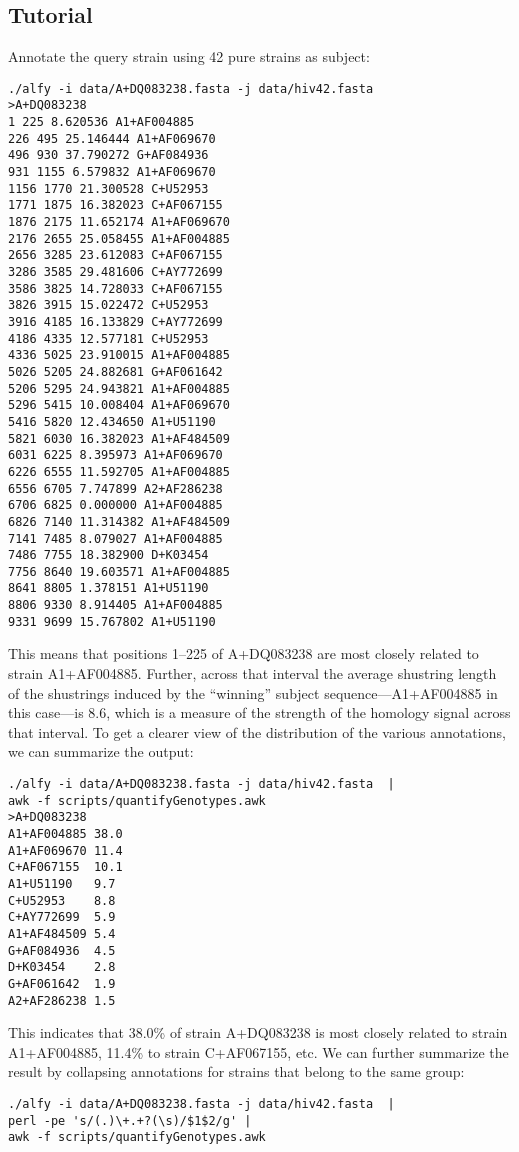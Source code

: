 \documentclass{article}
\begin{document}
\begin{itemize}
\section{Tutorial}
\bi
\I Annotate the query strain  using 42 pure strains as subject:
\begin{verbatim}
./alfy -i data/A+DQ083238.fasta -j data/hiv42.fasta
>A+DQ083238
1 225 8.620536 A1+AF004885
226 495 25.146444 A1+AF069670
496 930 37.790272 G+AF084936
931 1155 6.579832 A1+AF069670
1156 1770 21.300528 C+U52953
1771 1875 16.382023 C+AF067155
1876 2175 11.652174 A1+AF069670
2176 2655 25.058455 A1+AF004885
2656 3285 23.612083 C+AF067155
3286 3585 29.481606 C+AY772699
3586 3825 14.728033 C+AF067155
3826 3915 15.022472 C+U52953
3916 4185 16.133829 C+AY772699
4186 4335 12.577181 C+U52953
4336 5025 23.910015 A1+AF004885
5026 5205 24.882681 G+AF061642
5206 5295 24.943821 A1+AF004885
5296 5415 10.008404 A1+AF069670
5416 5820 12.434650 A1+U51190
5821 6030 16.382023 A1+AF484509
6031 6225 8.395973 A1+AF069670
6226 6555 11.592705 A1+AF004885
6556 6705 7.747899 A2+AF286238
6706 6825 0.000000 A1+AF004885
6826 7140 11.314382 A1+AF484509
7141 7485 8.079027 A1+AF004885
7486 7755 18.382900 D+K03454
7756 8640 19.603571 A1+AF004885
8641 8805 1.378151 A1+U51190
8806 9330 8.914405 A1+AF004885
9331 9699 15.767802 A1+U51190
\end{verbatim}
This means that positions 1--225 of A+DQ083238 are most closely
related to strain A1+AF004885. Further, across that interval the
average shustring length of the shustrings induced by the ``winning''
subject sequence---A1+AF004885 in this case---is 8.6, which is a measure of the strength of
the homology signal across that interval.
\I To get a clearer view of the distribution of the various annotations, we can
summarize the output:
\begin{verbatim}
./alfy -i data/A+DQ083238.fasta -j data/hiv42.fasta  | 
awk -f scripts/quantifyGenotypes.awk
>A+DQ083238
A1+AF004885	38.0
A1+AF069670	11.4
C+AF067155	10.1
A1+U51190	9.7
C+U52953	8.8
C+AY772699	5.9
A1+AF484509	5.4
G+AF084936	4.5
D+K03454	2.8
G+AF061642	1.9
A2+AF286238	1.5
\end{verbatim}
This indicates that 38.0\% of strain A+DQ083238 is most closely related
to strain A1+AF004885, 11.4\% to strain C+AF067155, etc. We can
further summarize the result by collapsing annotations for strains that
belong to the same group:
\begin{verbatim}
./alfy -i data/A+DQ083238.fasta -j data/hiv42.fasta  | 
perl -pe 's/(.)\+.+?(\s)/$1$2/g' | 
awk -f scripts/quantifyGenotypes.awk

\end{verbatim}
\end{itemize}
\end{document}
